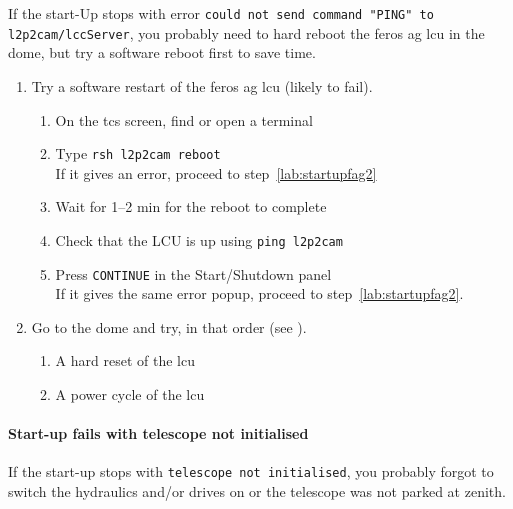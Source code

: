 \documentclass[11pt,fleqn,a4paper]{book}
\begin{document}
If the start-Up stops with error \texttt{could not send command "PING" to l2p2cam/lccServer}, you probably need to hard reboot the  \gls{feros} \gls{ag} \gls{lcu} in the dome, but try a software reboot first to save time.

    \begin{enumerate}
        \item Try a software restart of the \gls{feros} \gls{ag} \gls{lcu} (likely to fail).
        \begin{enumerate}
            \item On the \gls{tcs} screen, find or open a terminal
            \item Type \texttt{rsh \gls{l2p2cam} reboot}\\
                  If it gives an error, proceed to step~\ref{lab:startupfag2}
            \item Wait for 1--2 min for the reboot to complete 
            \item Check that the LCU is up using \texttt{ping \gls{l2p2cam}}
            \item Press \texttt{CONTINUE} in the Start/Shutdown panel\\
                  If it gives the same error popup, proceed to step~\ref{lab:startupfag2}. 
        \end{enumerate}
        \item\label{lab:startupfag2} Go to the dome and try, in that order (see ).
            \begin{enumerate}
            \item A hard reset of the \gls{lcu}
            \item A \gls{power cycle} of the \gls{lcu}
            \end{enumerate}
    \end{enumerate}

\paragraph{Start-up fails with telescope not initialised}

If the start-up stops with \texttt{telescope not initialised}, you probably forgot to switch the hydraulics and/or drives on or the telescope was not parked at zenith. 
\end{document}

